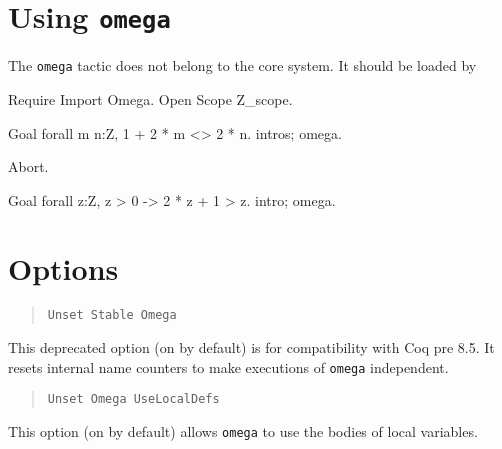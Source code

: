 

\section{Using {\tt omega}}

The {\tt omega} tactic does not belong to the core system. It should be
loaded by
\begin{coq_example*}
Require Import Omega.
Open Scope Z_scope.
\end{coq_example*}

\example{}

\begin{coq_example}
Goal forall m n:Z, 1 + 2 * m <> 2 * n.
intros; omega.
\end{coq_example}
\begin{coq_eval}
Abort.
\end{coq_eval}

\example{}

\begin{coq_example}
Goal forall z:Z, z > 0 -> 2 * z + 1 > z.
intro; omega.
\end{coq_example}


\section{Options}

\begin{quote}
  {\tt Unset Stable Omega}
\end{quote}
This deprecated option (on by default) is for compatibility with Coq
pre 8.5. It resets internal name counters to make executions of
{\tt omega} independent.

\begin{quote}
  {\tt Unset Omega UseLocalDefs}
\end{quote}
This option (on by default) allows {\tt omega} to use the bodies of
local variables.


